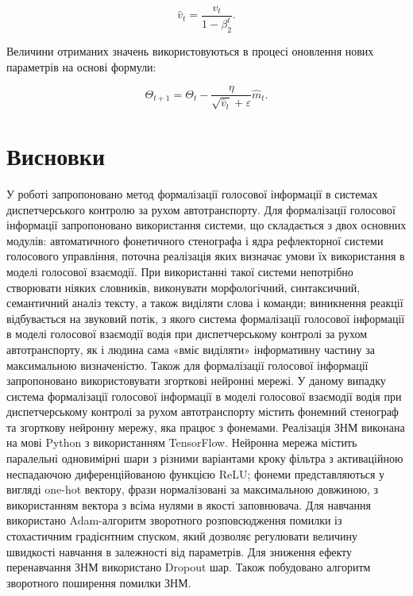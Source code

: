 \[
\hat{v}_t=\frac{v_t}{1-\beta_2^t}.
\]

Величини отриманих значень використовуються в процесі оновлення нових параметрів на основі формули:

\[
\Theta_{t+1}=\Theta_t-\frac{\eta}{\sqrt{\hat{v}_t}+\varepsilon}\hat{m}_t.
\]

\section{Висновки}

У роботі запропоновано метод формалізації голосової інформації в системах диспетчерського контролю за рухом автотранспорту. Для формалізації голосової інформації запропоновано використання системи, що складається з двох основних модулів: автоматичного фонетичного стенографа і ядра рефлекторної системи голосового управління, поточна реалізація яких визначає умови їх використання в моделі голосової взаємодії. При використанні такої системи непотрібно створювати ніяких словників, виконувати морфологічний, синтаксичний, семантичний аналіз тексту, а також виділяти слова і команди; виникнення реакції відбувається на звуковий потік, з якого система формалізації голосової інформації в моделі голосової взаємодії водія при диспетчерському контролі за рухом автотранспорту, як і людина сама «вміє виділяти» інформативну частину за максимальною визначеністю. Також для формалізації голосової інформації запропоновано використовувати згорткові нейронні мережі. У даному випадку система формалізації голосової інформації в моделі голосової взаємодії водія при диспетчерському контролі за рухом автотранспорту містить фонемний стенограф та згорткову нейронну мережу, яка працює з фонемами. Реалізація ЗНМ виконана на мові Python з використанням TensorFlow. Нейронна мережа містить паралельні одновимірні шари з різними варіантами кроку фільтра з активаційною неспадаючою диференційованою функцією ReLU; фонеми представляються у вигляді one-hot вектору, фрази нормалізовані за максимальною довжиною, з використанням вектора з всіма нулями в якості заповнювача. Для навчання використано Adam-алгоритм зворотного розповсюдження помилки із стохастичним градієнтним спуском, який дозволяє регулювати величину швидкості навчання в залежності від параметрів. Для зниження ефекту перенавчання ЗНМ використано Dropout шар. Також побудовано алгоритм зворотного поширення помилки ЗНМ. 